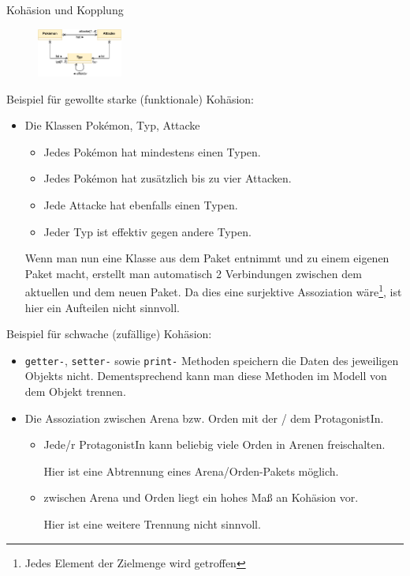 \begin{example}{Kohäsion und Kopplung}
    \begin{figure}
        \centering
        \includegraphics[width=0.25\textwidth]{includes/figures/example_diagrams_class_kohaesion.pdf}
    \end{figure}
    Beispiel für gewollte starke (funktionale) Kohäsion:
    \begin{itemize}
        \item Die Klassen Pokémon, Typ, Attacke
              \begin{itemize}
                  \item Jedes Pokémon hat mindestens einen Typen.
                  \item Jedes Pokémon hat zusätzlich bis zu vier Attacken.
                  \item Jede Attacke hat ebenfalls einen Typen.
                  \item Jeder Typ ist effektiv gegen andere Typen.
              \end{itemize}

              Wenn man nun eine Klasse aus dem Paket entnimmt und zu einem eigenen Paket macht, erstellt man automatisch 2 Verbindungen zwischen dem aktuellen und dem neuen Paket.
              Da dies eine surjektive Assoziation wäre\footnote{Jedes Element der Zielmenge wird getroffen}, ist hier ein Aufteilen nicht sinnvoll.
    \end{itemize}

    Beispiel für schwache (zufällige) Kohäsion:
    \begin{itemize}
        \item \texttt{getter-}, \texttt{setter-} sowie \texttt{print-} Methoden speichern die Daten des jeweiligen Objekts nicht.
              Dementsprechend kann man diese Methoden im Modell von dem Objekt trennen.
        \item Die Assoziation zwischen Arena bzw. Orden mit der / dem ProtagonistIn.
              \begin{itemize}
                  \item Jede/r ProtagonistIn kann beliebig viele Orden in Arenen freischalten.

                        Hier ist eine Abtrennung eines Arena/Orden-Pakets möglich.
                  \item zwischen Arena und Orden liegt ein hohes Maß an Kohäsion vor.

                        Hier ist eine weitere Trennung nicht sinnvoll.
              \end{itemize}
    \end{itemize}
\end{example}

